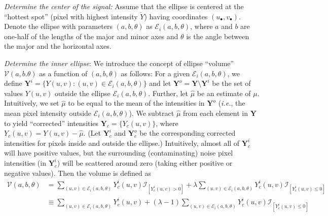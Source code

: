 \documentclass[12pt]{article}
\newenvironment{packed_enum}{
\begin{enumerate}[leftmargin=1.2em]
  \setlength{\itemsep}{1pt}
  \setlength{\parskip}{0pt}
  \setlength{\parsep}{0pt}
}{\end{enumerate}}
\newcommand{\bY}{\boldsymbol{Y}}
\newcommand{\mI}{\mathcal I}
\newcommand{\mE}{\mathcal E}
\newcommand{\mV}{\mathcal V}
\begin{document}
\begin{packed_enum}
\item \label{step1} {\em Determine the center of the signal:} Assume 
that the ellipse is centered at the ``hottest spot'' (pixel with
highest intensity $\check Y$) having coordinates $(u_\bullet
,v_\bullet)$. Denote the ellipse with parameters $(a,b,\theta)$ as
$\mE_i(a,b,\theta)$, where $a$ and $b$ are one-half of  
the  lengths of the major and minor axes and $\theta $ is
the angle between  the major and the horizontal axes.  

\item  \label{step2} {\em Determine the inner ellipse}:
  We introduce the concept of ellipse ``volume''
  $\mV(a,b.\theta)$ as a function of $(a,b,\theta)$ as follows:  For a
  given $\mE_i(a,b,\theta)$, we 
  define $\bY^i =\{Y(u,v):(u,v)\in \mE_i(a,b,\theta)\}$ and let
  $\bY^o=\bY\setminus\bY^i$ be the set of values $Y(u,v)$ outside the
  ellipse $\mE_i(a,b,\theta)$. Further, let $\hat\mu$ be an estimate of 
  $\mu$. Intuitively, we set $\hat\mu$ to be 
  equal to the mean of the intensities in $\bY^o$ ({\em i.e.}, 
  the mean pixel intensity outside $\mE_i(a,b,\theta)$). 
We subtract $\hat\mu$   %
  from each element in $\bY$ to yield
  ``corrected'' intensities $\bY_c =\{Y_c(u,v)\}$, where
  $Y_c(u,v)=Y(u,v) - \hat\mu$. (Let $\bY^i_c$ and $\bY^o_c$ be the
  corresponding corrected intensities for pixels inside and outside
  the ellipse.) Intuitively, almost all of $\bY^i_c$ will have
  positive values, but the surrounding (contaminating) noise
  pixel intensities (in $\bY^i_c$) will be 
  scattered around zero (taking either positive or negative
  values). Then the volume is defined as
  \begin{equation} 
\label{voleqn} 
\begin{split}
\mV(a,b,\theta) & =\sum _{(u,v)\in\mE_i(a,b,\theta)} Y^i_c(u,v) \mI_{[Y^i_c(u,v) >0]} +\lambda 
\sum _{(u,v)\in\mE_i(a,b,\theta)} Y^i_c(u,v) \mI_{[ Y^i_c(u,v) \leq 0]} \\
&\equiv \sum_{(u,v)\in\mE_i(a,b,\theta)}Y^i_c(u,v) + (\lambda -1 )\sum_{(u,v)\in\mE_i(a,b,\theta)} Y^i_c(u,v) \mI_{[ Y^i_c(u,v) \leq 0]}
\end{split}

\end{equation}
\end{packed_enum}
\end{document}
